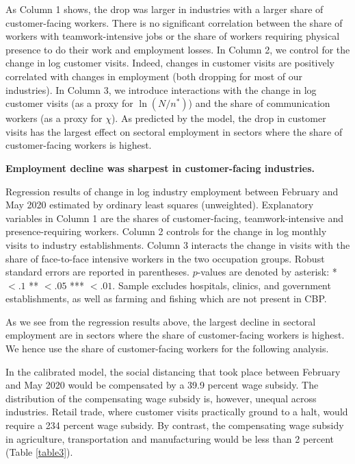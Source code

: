 As Column 1 shows, the drop was larger in industries with a larger share of customer-facing workers. There is no significant correlation between the share of workers with teamwork-intensive jobs or the share of workers requiring physical presence to do their work and employment losses. In Column 2, we control for the change in log customer visits. Indeed, changes in customer visits are positively correlated with changes in employment (both dropping for most of our industries).  In Column 3, we introduce interactions with the change in log customer visits (as a proxy for $\ln (N/n^*)$) and the share of communication workers (as a proxy for $\chi$). As predicted by the model, the drop in customer visits has the largest effect on sectoral employment in sectors where the share of customer-facing workers is highest.
 
\begin{table}[!ht]
\caption{
{\bf Employment decline was sharpest in customer-facing industries.}}

\begin{flushleft} Regression results of change in log industry employment between February and May 2020 estimated by ordinary least squares (unweighted). Explanatory variables in Column 1 are the shares of customer-facing, teamwork-intensive and presence-requiring workers. Column 2 controls for the change in log monthly visits to industry establishments. Column 3 interacts the change in visits with the share of face-to-face intensive  workers in the two occupation groups. Robust standard errors are reported in parentheses. $p$-values are denoted by asterisk: * $<.1$ ** $<.05$ *** $<.01$.
Sample excludes hospitals, clinics, and government establishments, as well as farming and fishing which are not present in CBP.
\end{flushleft}
\label{table4}
\end{table}


As we see from the regression results above, the largest decline in sectoral employment are in sectors where the share of customer-facing workers is highest. We hence use the share of customer-facing workers for the following analysis. 

In the calibrated model, the social distancing that took place between February and May 2020 would be compensated by a 39.9 percent wage subsidy. The distribution of the compensating wage subsidy is, however, unequal across industries. Retail trade, where customer visits practically ground to a halt, would require a 234 percent wage subsidy. By contrast, the compensating wage subsidy in agriculture, transportation and manufacturing would be less than 2 percent (Table \ref{table3}).

